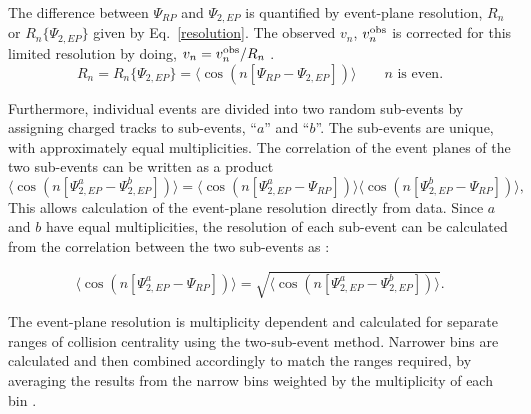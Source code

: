 The difference between $\Psi_{RP}$ and \(\Psi_{2, EP}\) is quantified by event-plane resolution, $R_n$ or $R_n\{\Psi_{2, EP}\}$ given by Eq.~\ref{resolution}. 
%
The observed $v_n$, $v_n^{\rm obs}$ is corrected for this limited resolution by doing, $v_n = v_{n}^{\rm obs}/R_n$ \cite{Abbas:2013taa,Poskanzer:1998yz}.  
%
\begin{equation}
	R_n = R_n\{\Psi_{2, EP}\} = \langle \cos(n[\Psi_{RP} - \Psi_{2, EP}]) \rangle \qquad \text{$n$ is even}.
	\label{resolution}
\end{equation}

Furthermore, individual events are divided into two random sub-events by assigning charged tracks to sub-events, ``$a$'' and ``$b$''. 
%
The sub-events are unique, with approximately equal multiplicities. 
%
The correlation of the event planes of the two sub-events can be written as a product~\cite{PhysRevC.55.1420,Poskanzer:1998yz}
%
\begin{equation}
	\langle \cos(n[\Psi_{2, EP}^{a} - \Psi_{2, EP}^{b}]) \rangle = 
	\langle \cos(n[\Psi_{2, EP}^{a} - \Psi_{RP}]) \rangle
	\langle \cos(n[\Psi_{2, EP}^{b} - \Psi_{RP}]) \rangle,
	\label{resolution2sub}
\end{equation}
%
This allows calculation of the event-plane resolution directly from data. Since $a$ and $b$ have equal multiplicities, the resolution of each sub-event can be calculated from the correlation between the two sub-events as \cite{Poskanzer:1998yz}:

\begin{equation}
	\langle \cos(n[\Psi_{2, EP}^{a} - \Psi_{RP}]) \rangle = 
	\sqrt{\langle \cos(n[\Psi_{2, EP}^{a} - \Psi_{2, EP}^{b}]) \rangle} .
	\label{resolutionIndiv}
\end{equation}

The event-plane resolution is multiplicity dependent and calculated for separate ranges of collision centrality using the two-sub-event method.  
%
Narrower bins are calculated and then combined accordingly to match the ranges required, by averaging the results from the narrow bins weighted by the multiplicity of each bin \cite{Voloshin:2008dg}.
